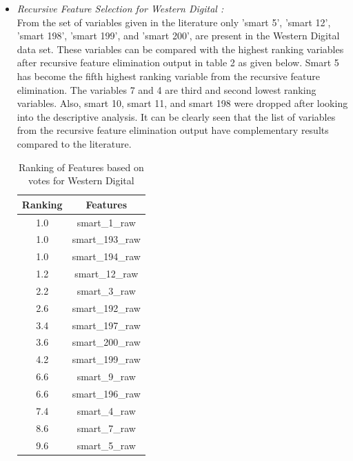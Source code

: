 \documentclass[conference]{IEEEtran}
\begin{document}
\begin{itemize}
    \item \textit{Recursive Feature Selection for Western Digital :}\\
    From the set of variables given in the literature \cite{b13} only 'smart 5', 'smart 12', 'smart 198', 'smart 199', and 'smart 200', are present in the Western Digital data set. These variables can be compared with the highest ranking variables after recursive feature elimination output in table 2 as given below. Smart 5 has become the fifth highest ranking variable from the recursive feature elimination. The variables 7 and 4 are third and second lowest ranking variables. Also, smart 10, smart 11, and smart 198  were dropped after looking into the descriptive analysis. It can be clearly seen that the list of variables from the recursive feature elimination output have complementary results compared to the literature.\\
    
    \begin{table}[]
    \begin{center}
    \caption{Ranking of Features based on votes for Western Digital}
    \begin{tabular}{|c||c|}
    \hline
    \textbf{Ranking} & \textbf{Features}\\ \hline
    1.0     & smart\_1\_raw   \\ \hline
    1.0     & smart\_193\_raw \\ \hline
    1.0     & smart\_194\_raw \\ \hline
    1.2     & smart\_12\_raw  \\ \hline
    2.2     & smart\_3\_raw   \\ \hline
    2.6     & smart\_192\_raw \\ \hline
    3.4     & smart\_197\_raw \\ \hline
    3.6     & smart\_200\_raw \\ \hline
    4.2     & smart\_199\_raw \\ \hline
    6.6     & smart\_9\_raw   \\ \hline
    6.6     & smart\_196\_raw \\ \hline
    7.4     & smart\_4\_raw   \\ \hline
    8.6     & smart\_7\_raw   \\ \hline
    9.6     & smart\_5\_raw   \\ \hline
    \end{tabular}
    \end{center}
    \end{table}
    

\end{itemize}
\end{document}
